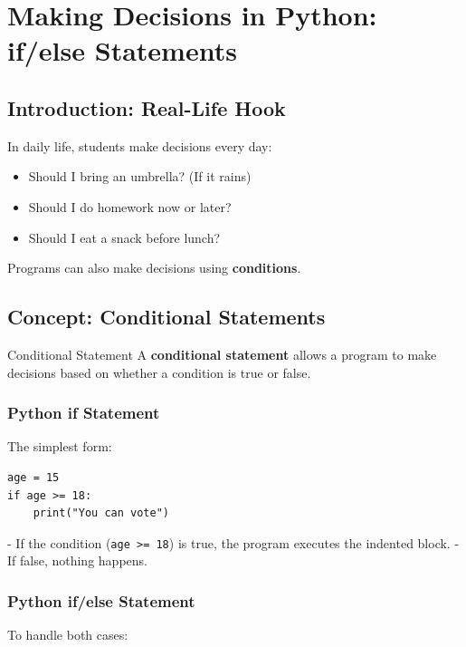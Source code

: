 \chapter{Making Decisions in Python: if/else Statements}

\section{Introduction: Real-Life Hook}

In daily life, students make decisions every day:  

\begin{itemize}
    \item Should I bring an umbrella? (If it rains)  
    \item Should I do homework now or later?  
    \item Should I eat a snack before lunch?  
\end{itemize}

Programs can also make decisions using \textbf{conditions}.

\section{Concept: Conditional Statements}

\begin{definition}{Conditional Statement}
A \textbf{conditional statement} allows a program to make decisions based on whether a condition is true or false.
\end{definition}

\subsection{Python if Statement}

The simplest form:

\begin{verbatim}
age = 15
if age >= 18:
    print("You can vote")
\end{verbatim}

- If the condition (\texttt{age >= 18}) is true, the program executes the indented block.  
- If false, nothing happens.

\subsection{Python if/else Statement}

To handle both cases:


